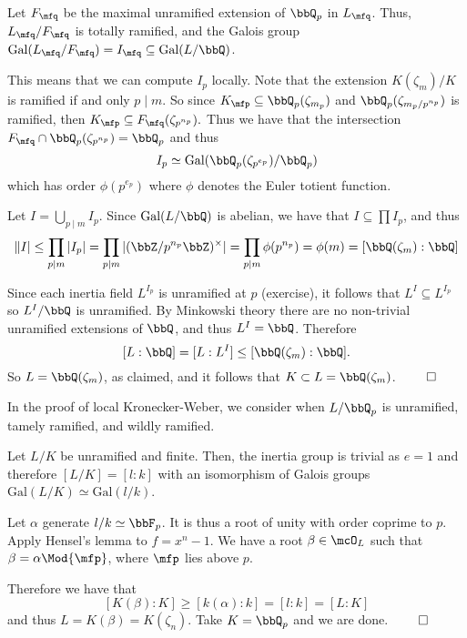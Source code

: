 \documentclass[a4paper, 12pt,oneside,openany]{book}
\begin{document}
Let $F_\mfq$ be the maximal unramified extension of $\bbQ_p$ in $L_\mfq$. Thus, $L_\mfq / F_\mfq$ is totally ramified, and the Galois group $\text{Gal}(L_\mfq / F_\mfq) = I_\mfq \subseteq \text{Gal}(L/\bbQ)$.

This means that we can compute $I_p$ locally. Note that the extension $K(\zeta_m)/K$ is ramified if and only $p \mid m$. So since $K_\mfp \subseteq \bbQ_p(\zeta_{m_p})$ and $\bbQ_p(\zeta_{m_p / p^{n_p}})$ is ramified, then $K_\mfp \subseteq F_\mfq(\zeta_{p^{n_p}}).$ Thus we have that the intersection $F_\mfq \cap \bbQ_p(\zeta_{p^{n_p}}) = \bbQ_p$ and thus $$I_p \simeq \text{Gal}(\bbQ_p(\zeta_{p^{e_p}})/\bbQ_p)$$ which has order $\phi(p^{e_p})$ where $\phi$ denotes the Euler totient function.

Let $I=\bigcup\limits_{p \mid m} I_p $. Since $\text{Gal}(L/\bbQ)$ is abelian, we have that $I \subseteq \prod I_p$, and thus $$\|I| \leq \prod\limits_{p \mid m} |I_p| = \prod\limits_{p | m} |(\bbZ/p^{n_p} \bbZ)^\times| = \prod\limits_{p\mid m} \phi(p^{n_p}) = \phi(m) = [\bbQ(\zeta_m):\bbQ]$$

Since each inertia field $L^{I_p}$ is unramified at $p$ (exercise), it follows that $L^I \subseteq L^{I_p}$ so $L^I/\bbQ$ is unramified. By Minkowski theory there are no non-trivial unramified extensions of $\bbQ$, and thus $L^I=\bbQ$. Therefore $$[L:\bbQ] = [L:L^I] \leq [\bbQ(\zeta_m):\bbQ].$$ So $L=\bbQ(\zeta_m)$, as claimed, and it follows that $K \subset L =\bbQ(\zeta_m)$. $\qed$

In the proof of local Kronecker-Weber, we consider when $L/\bbQ_p$ is unramified, tamely ramified, and wildly ramified.


Let $L/K$ be unramified and finite. Then, the inertia group is trivial as $e=1$ and therefore $[L/K] = [l:k]$ with an isomorphism of Galois groups $\text{Gal}(L/K) \simeq \text{Gal}(l/k)$.

Let $\alpha$ generate $l/k \simeq \bbF_p$. It is thus a root of unity with order coprime to $p$. Apply Hensel's lemma to $f = x^n-1$. We have a root $\beta \in \mcO_L$ such that $\beta = \alpha \Mod{\mfp}$, where $\mfp$ lies above $p$. 

Therefore we have that $$[K(\beta):K] \geq [k(\alpha):k]=[l:k]=[L:K]$$ and thus $L=K(\beta)=K(\zeta_n)$. Take $K=\bbQ_p$ and we are done. $\qed$


\end{document}
